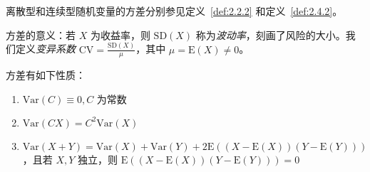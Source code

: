 \documentclass[../main.tex]{subfiles}
\begin{document}
离散型和连续型随机变量的方差分别参见定义~\ref{def:2.2.2} 和定义~\ref{def:2.4.2}。

方差的意义：若 $X$ 为收益率，则 $\mathrm{SD}(X)$ 称为\emph{波动率}，刻画了风险的大小。我们定义\emph{变异系数} $\mathrm{CV}=\frac{\mathrm{SD}(X)}{\mu}$，其中 $\mu=\mathrm E(X)\neq0$。

\begin{proposition}
方差有如下性质：
\begin{enumerate}
    \item $\mathrm{Var}(C)\equiv 0,C\text{ 为常数}$
    \item $\mathrm{Var}(CX)=C^2\mathrm{Var}(X)$
    \item $\mathrm{Var}(X+Y)=\mathrm{Var}(X)+\mathrm{Var}(Y)+2\mathrm{E}((X-\mathrm{E}(X))(Y-\mathrm{E}(Y)))$，且若 $X,Y$ 独立，则 $\mathrm{E}((X-\mathrm{E}(X))(Y-\mathrm{E}(Y)))=0$
\end{enumerate}
\end{proposition}
\end{document}
